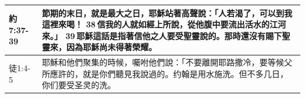 \begin{table}[H]
\begin{tabular}{p{4em}|p{44em}}
約7:37-39&節期的末日，就是最大之日，耶穌站著高聲說：「人若渴了，可以到我這裡來喝！ 38 信我的人就如經上所說，從他腹中要流出活水的江河來。」 39 耶穌這話是指著信他之人要受聖靈說的。那時還沒有賜下聖靈來，因為耶穌尚未得著榮耀。\\  \midrule

徒1:4-5&耶穌和他們聚集的時候，囑咐他們說：「不要離開耶路撒冷，要等候父所應許的，就是你們聽見我說過的。约翰是用水施洗。但不多几日，你们要受圣灵的洗。\\ \bottomrule
\end{tabular}%
\end{table}







